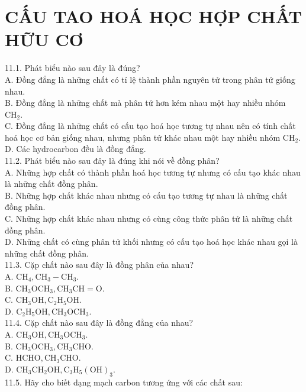 \documentclass[10pt]{article}
\begin{document}
\section*{CẤU TAO HOÁ HỌC HỢP CHẤT HỮU CƠ}
11.1. Phát biểu nào sau đây là đúng?\\
A. Đồng đẳng là những chất có tỉ lệ thành phần nguyên tử trong phân tử giống nhau.\\
B. Đồng đẳng là những chất mà phân tử hơn kém nhau một hay nhiều nhóm $\mathrm{CH}_{2}$.\\
C. Đồng đẳng là những chất có cấu tạo hoá học tương tự nhau nên có tính chất hoá học cơ bản giống nhau, nhưng phân tử khác nhau một hay nhiều nhóm $\mathrm{CH}_{2}$.\\
D. Các hydrocarbon đều là đồng đẳng.\\
11.2. Phát biểu nào sau đây là đúng khi nói về đồng phân?\\
A. Những hợp chất có thành phần hoá học tương tự nhưng có cấu tạo khác nhau là những chất đồng phân.\\
B. Những hợp chất khác nhau nhưng có cấu tạo tương tự nhau là những chất đồng phân.\\
C. Những hợp chất khác nhau nhưng có cùng công thức phân tử là những chất đồng phân.\\
D. Những chất có cùng phân tử khối nhưng có cấu tạo hoá học khác nhau gọi là những chất đồng phân.\\
11.3. Cặp chất nào sau đây là đồng phân của nhau?\\
A. $\mathrm{CH}_{4}, \mathrm{CH}_{3}-\mathrm{CH}_{3}$.\\
B. $\mathrm{CH}_{3} \mathrm{OCH}_{3}, \mathrm{CH}_{3} \mathrm{CH}=\mathrm{O}$.\\
C. $\mathrm{CH}_{3} \mathrm{OH}, \mathrm{C}_{2} \mathrm{H}_{5} \mathrm{OH}$.\\
D. $\mathrm{C}_{2} \mathrm{H}_{5} \mathrm{OH}, \mathrm{CH}_{3} \mathrm{OCH}_{3}$.\\
11.4. Cặp chất nào sau đây là đồng đẳng của nhau?\\
A. $\mathrm{CH}_{3} \mathrm{OH}, \mathrm{CH}_{3} \mathrm{OCH}_{3}$.\\
B. $\mathrm{CH}_{3} \mathrm{OCH}_{3}, \mathrm{CH}_{3} \mathrm{CHO}$.\\
C. $\mathrm{HCHO}, \mathrm{CH}_{3} \mathrm{CHO}$.\\
D. $\mathrm{CH}_{3} \mathrm{CH}_{2} \mathrm{OH}, \mathrm{C}_{3} \mathrm{H}_{5}(\mathrm{OH})_{3}$.\\
11.5. Hãy cho biết dạng mạch carbon tương ứng với các chất sau:\\
\end{document}
